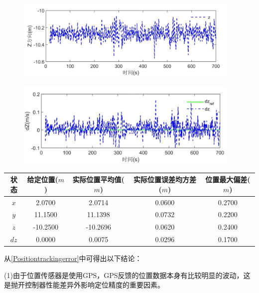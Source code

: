 \documentclass[
  type=master
]{gdutthesis}
\begin{document}
\begin{figure}[H]
	\centering
	\includegraphics[width=0.96\textwidth]{屏幕截图 2022-04-10 193919.png}
	\label{fig:ztrackingresults}
\end{figure}

\begin{figure}[H]
	\centering
	\includegraphics[width=0.96\textwidth]{屏幕截图 2022-04-10 194636.png}
	\label{fig:zveltrackingresults}
\end{figure}

\begin{table}[h]
	\label{Positiontrackingerror}
	\begin{tabular}{ccccc}
		\toprule
		状态 & 给定位置($m$) & 实际位置平均值($m$) & 实际位置误差均方差($m$) & 位置最大偏差($m$)\\
		\midrule
		$x$ & 2.0700 & 2.0714 & 0.0600 & 0.2700 \\ 
		$y$ & 11.1500 & 11.1398 & 0.0732 & 0.2200 \\
		$z$ & -10.2500 & -10.2696 & 0.0620 & 0.2400 \\
		$dz$ & 0.0000 & 0.0075 & 0.0296 & 0.1700 \\
		\bottomrule 
	\end{tabular}
\end{table}

从\autoref{Positiontrackingerror}中可得出以下结论：

(1)由于位置传感器是使用GPS，GPS反馈的位置数据本身有比较明显的波动，这是抛开控制器性能差异外影响定位精度的重要因素。
\end{document}
